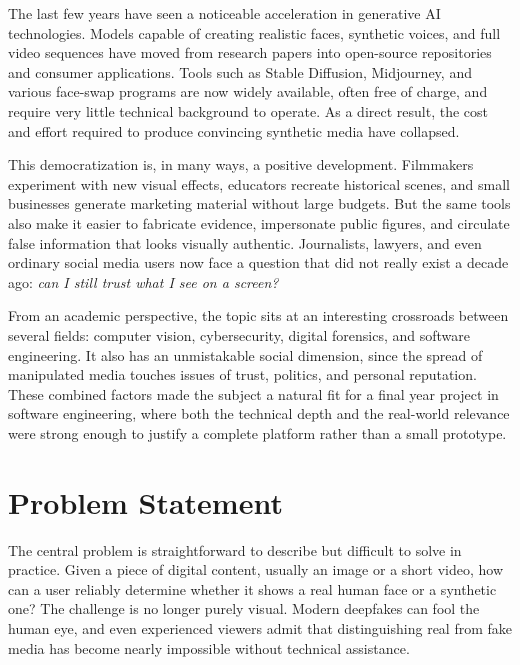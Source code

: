 The last few years have seen a noticeable acceleration in generative AI technologies. Models capable of creating realistic faces, synthetic voices, and full video sequences have moved from research papers into open-source repositories and consumer applications. Tools such as Stable Diffusion, Midjourney, and various face-swap programs are now widely available, often free of charge, and require very little technical background to operate. As a direct result, the cost and effort required to produce convincing synthetic media have collapsed.

This democratization is, in many ways, a positive development. Filmmakers experiment with new visual effects, educators recreate historical scenes, and small businesses generate marketing material without large budgets. But the same tools also make it easier to fabricate evidence, impersonate public figures, and circulate false information that looks visually authentic. Journalists, lawyers, and even ordinary social media users now face a question that did not really exist a decade ago: \textit{can I still trust what I see on a screen?}

From an academic perspective, the topic sits at an interesting crossroads between several fields: computer vision, cybersecurity, digital forensics, and software engineering. It also has an unmistakable social dimension, since the spread of manipulated media touches issues of trust, politics, and personal reputation. These combined factors made the subject a natural fit for a final year project in software engineering, where both the technical depth and the real-world relevance were strong enough to justify a complete platform rather than a small prototype.

\section{Problem Statement}

The central problem is straightforward to describe but difficult to solve in practice. Given a piece of digital content, usually an image or a short video, how can a user reliably determine whether it shows a real human face or a synthetic one? The challenge is no longer purely visual. Modern deepfakes can fool the human eye, and even experienced viewers admit that distinguishing real from fake media has become nearly impossible without technical assistance.

